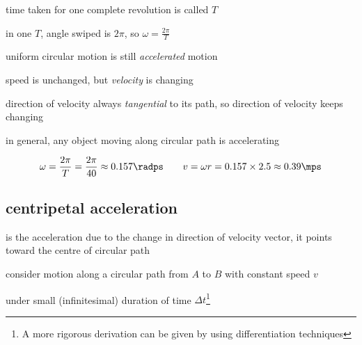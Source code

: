 \cmt time taken for one complete revolution is called  $T$

in one $T$, angle swiped is $2\pi$, so $\boxed{\omega=\frac{2\pi}{T}}$

\cmt uniform circular motion is still \emph{accelerated} motion

speed is unchanged, but \emph{velocity} is changing

direction of velocity always \emph{tangential} to its path, so direction of velocity keeps changing

in general, any object moving along circular path is accelerating


\solc
\begin{equation*}
	\omega = \frac{2\pi}{T} = \frac{2\pi}{40} \approx 0.157 \radps \qquad v = \omega r = 0.157 \times 2.5 \approx 0.39 \mps 
\end{equation*}




\subsection{centripetal acceleration}

\rcyskip

\begin{ilight}
	 is the acceleration due to the change in direction of velocity vector, it points toward the centre of circular path
\end{ilight}

consider motion along a circular path from $A$ to $B$ with constant speed $v$

under small (infinitesimal) duration of time $\Delta t$\footnote{A more rigorous derivation can be given by using differentiation techniques}

